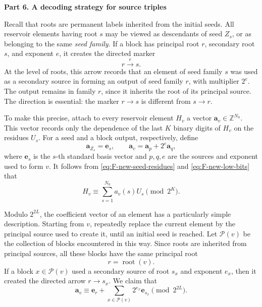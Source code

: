 \documentclass{article}
\theoremstyle{definition}
\begin{document}
\vskip 10pt


\noindent
{\bf Part 6. A decoding strategy for source triples}

Recall that roots are permanent labels inherited from the initial seeds.
All reservoir elements having root $s$ may be viewed as descendants of seed
$Z_s$, or as belonging to the same \emph{seed family}.  If a block has
principal root $r$, secondary root $s$, and exponent $e$, it creates the
directed marker
$$
 r\xrightarrow{e}s.
$$
At the level of roots, this arrow records that an element of seed family $s$
was used as a secondary source in forming an output of seed family $r$, with
multiplier $2^e$.  The output remains in family $r$, since it inherits the
root of its principal source.  The direction is essential: the marker
$r\to s$ is different from $s\to r$.

To make this precise, attach to every reservoir element $H_v$ a vector
$\mathbf a_v\in\mathbb Z^{N_0}$.  This vector records only the dependence of the last $K$ binary digits of $H_v$ on the residues $U_s$. 
For a seed and a block output, respectively,
define
\begin{equation}
 \mathbf a_{Z_s}=\mathbf e_s,
 \qquad
 \mathbf a_v=\mathbf a_p+2^e\mathbf a_q,
 \label{eq:F-new-formal-vectors}
\end{equation}
where $\mathbf e_s$ is the $s$-th standard basis vector and $p,q,e$ are the
sources and exponent used to form $v$.  It follows from
\eqref{eq:F-new-seed-residues} and \eqref{eq:F-new-low-bits} that
\begin{equation}
 H_v\equiv\sum_{s=1}^{N_0}a_v(s)U_s\pmod {2^K}.
 \label{eq:F-new-formal-evaluation}
\end{equation}

Modulo $2^{2L}$, the coefficient vector of an element has a particularly
simple description.  Starting from $v$, repeatedly replace the current
element by the principal source used to create it, until an initial seed is
reached.  Let $\mathcal P(v)$ be the collection of blocks encountered in this
way.  Since roots are inherited from principal sources, all these blocks have
the same principal root
$$
 r=\operatorname{root}(v).
$$
If a block $x\in\mathcal P(v)$ used a secondary source of root $s_x$ and
exponent $e_x$, then it created the directed arrow $r\to s_x$.  We claim that
\begin{equation}
 \mathbf a_v
 \equiv
 \mathbf e_r+
 \sum_{x\in\mathcal P(v)}2^{e_x}\mathbf e_{s_x}
 \pmod {2^{2L}}.
 \label{eq:F-new-ancestry-expansion}
\end{equation}
\end{document}
